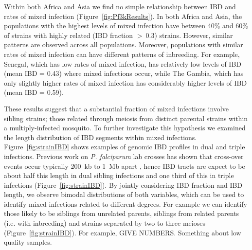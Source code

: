 \documentclass[9pt,lineno]{elife}
\begin{document}
Within both Africa and Asia we find no simple relationship between IBD and rates of mixed infection (Figure~\ref{fig:Pf3kResults}).  In both Africa and Asia, the populations with the highest levels of mixed infection have between 40\% and 60\% of strains with highly related (IBD fraction $>~0.3$) strains.  However, similar patterns are observed across all populations.  Moreover, populations with similar rates of mixed infection can have different patterns of inbreeding.  For example, Senegal, which has low rates of mixed infection, has relatively low levels of IBD (mean IBD = 0.43) where mixed infections occur, while The Gambia, which has only slightly higher rates of mixed infection has considerably higher levels of IBD (mean IBD = 0.59).

These results suggest that a substantial fraction of mixed infections involve sibling strains; those related through meiosis from distinct parental strains within a multiply-infected mosquito.  To further investigate this hypothesis we examined the length distribution of IBD segments within mixed infections.  Figure~\ref{fig:strainIBD} shows examples of genomic IBD profiles in dual and triple infections.  Previous work on {\it P. falciparum} lab crosses has shown that cross-over events occur typically 200~kb to 1~Mb apart \citet{Miles2016}, hence IBD tracts are expect to be about half this length in dual sibling infections and one third of this in triple infections (Figure~\ref{fig:strainIBD}).  By jointly considering IBD fraction and IBD length, we observe bimodal distributions of both variables, which can be used to identify mixed infections related to different degrees.  For example we can identify those likely to be siblings from unrelated parents, siblings from related parents (i.e. with inbreeding) and strains separated by two to three meioses (Figure~\ref{fig:strainIBD}).  For example, GIVE NUMBERS. Something about low quality samples.
\end{document}
